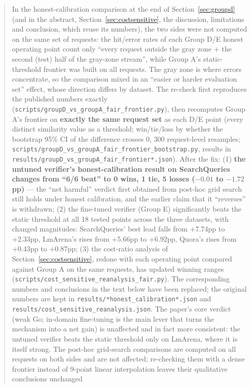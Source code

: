 \documentclass[11pt]{article}
\begin{document}
\begin{quote}
\noindent In the honest-calibration comparison at the end of Section~\ref{sec:groupd} (and in the abstract, Section~\ref{sec:costsensitive}, the discussion, limitations and conclusion, which reuse its numbers), the two sides were not computed on the same set of requests: the hit/error rates of each Group D/E honest operating point count only ``every request outside the gray zone + the second (test) half of the gray-zone stream'', while Group A's static-threshold frontier was built on all requests. The gray zone is where errors concentrate, so the comparison mixed in an ``easier or harder evaluation set'' effect, whose direction differs by dataset. The re-check first reproduces the published numbers exactly (\texttt{scripts/\allowbreak{}group\allowbreak{}D\_\allowbreak{}vs\_\allowbreak{}group\allowbreak{}A\_\allowbreak{}fair\_\allowbreak{}frontier.\allowbreak{}py}), then recomputes Group A's frontier on \textbf{exactly the same request set} as each D/E point (every distinct similarity value as a threshold; win/tie/loss by whether the bootstrap 95\% CI of the difference crosses 0, 300 request-level resamples; \texttt{scripts/\allowbreak{}group\allowbreak{}D\_\allowbreak{}vs\_\allowbreak{}group\allowbreak{}A\_\allowbreak{}fair\_\allowbreak{}frontier\_\allowbreak{}bootstrap.\allowbreak{}py}, results in \texttt{results/\allowbreak{}group\allowbreak{}D\_\allowbreak{}vs\_\allowbreak{}group\allowbreak{}A\_\allowbreak{}fair\_\allowbreak{}frontier*.\allowbreak{}json}). After the fix: (1) \textbf{the untuned verifier's honest-calibration result on SearchQueries changes from ``6/6 beat'' to 0 wins, 1 tie, 5 losses ($-0.01$ to $-1.72$pp)} --- the ``net harmful'' verdict first obtained from post-hoc grid search still holds under honest calibration, and the earlier claim that it ``reverses'' is withdrawn; (2) the fine-tuned verifier (Group E) significantly beats the static threshold at all 18 tested points across the three datasets, with changed magnitudes: SearchQueries' best lead falls from +7.74pp to +2.33pp, LmArena's rises from +5.66pp to +6.92pp, Quora's rises from +0.43pp to +0.87pp; (3) the cost-ratio analysis of Section~\ref{sec:costsensitive}, redone with each operating point compared against Group A on the same requests, has updated winning ranges (\texttt{scripts/\allowbreak{}cost\_\allowbreak{}sensitive\_\allowbreak{}reanalysis\_\allowbreak{}fair.\allowbreak{}py}). The corresponding numbers and conclusions in the text below have been replaced; the original numbers are kept in \texttt{results/\allowbreak{}*honest\_\allowbreak{}calibration*.\allowbreak{}json} and \texttt{results/\allowbreak{}cost\_\allowbreak{}sensitive\_\allowbreak{}reanalysis.\allowbreak{}json}. The paper's core verdict (weak Go; in-domain fine-tuning is the main lever that turns the mechanism into a net gain) is unaffected and in fact more consistent: the untuned verifier beats the static threshold only on LmArena, where it is itself strong. The post-hoc grid-search comparisons are computed on all requests on both sides and are not affected; re-checking them with a dense frontier instead of 9-point linear interpolation leaves their qualitative conclusions unchanged 
\end{quote}
\end{document}

